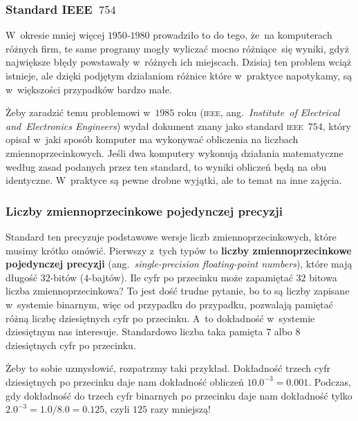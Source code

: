 \documentclass[10pt,t]{beamer}
\begin{document}
\begin{frame}
  \frametitle{Standard IEEE~$754$}


  W~okresie mniej więcej $1950\text{-}1980$ prowadziło to do tego,
  że~na komputerach różnych firm, te same programy mogły wyliczać mocno
  różniące~się wyniki, gdyż największe błędy powstawały w~różnych ich
  miejscach. Dzisiaj ten problem wciąż istnieje, ale dzięki podjętym
  działaniom różnice które w~praktyce napotykamy, są w~większości przypadków
  bardzo małe.

  Żeby zaradzić temu problemowi w~$1985$ roku
   (\textsc{ieee}, ang.~\textit{Institute~of Electrical
    and~Electronics Engineers}) wydał dokument znany jako standard
  \textsc{ieee}~$754$, który opisał w~jaki sposób komputer ma wykonywać
  obliczenia na liczbach zmiennoprzecinkowych. Jeśli dwa komputery wykonują
  działania matematyczne według zasad podanych przez ten standard, to wyniki
  obliczeń będą na obu identyczne. W~praktyce są pewne drobne wyjątki,
  ale to temat na inne zajęcia.

\end{frame}





\begin{frame}
  \frametitle{Liczby zmiennoprzecinkowe pojedynczej precyzji}


  Standard ten precyzuje podstawowe wersje liczb zmiennoprzecinkowych, które
  musimy krótko omówić. Pierwszy z~tych typów to \textbf{liczby
    zmiennoprzecinkowe pojedynczej precyzji} (ang.~\textit{single-precision
    floating-point numbers}), które mają długość $32$-bitów ($4$-bajtów).
  Ile cyfr po przecinku może zapamiętać $32$ bitowa liczba
  zmiennoprzecinkowa? To jest dość trudne pytanie, bo to są liczby zapisane
  w~systemie \alert{binarnym}, więc od przypadku do przypadku, pozwalają
  pamiętać różną liczbę \alert{dziesiętnych} cyfr po przecinku. A~to
  dokładność w~systemie dziesiętnym nas interesuje. Standardowo liczba
  taka pamięta $7$ albo $8$ \alert{dziesiętnych} cyfr po przecinku.

  Żeby to sobie uzmysłowić, rozpatrzmy taki przykład. Dokładność trzech
  cyfr \alert{dziesiętnych} po przecinku daje nam dokładność
  obliczeń $10.0^{ -3 } = 0.001$. Podczas, gdy dokładność do trzech cyfr
  \alert{binarnych} po przecinku daje nam dokładność tylko
  $2.0^{ -3 } = 1.0 / 8.0 = 0.125$, czyli $125$ razy mniejszą!

\end{frame}
\end{document}
